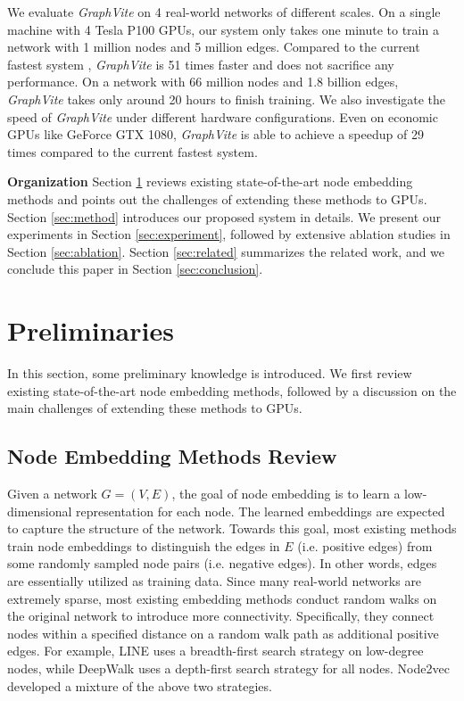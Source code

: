 \documentclass[sigconf]{acmart}
\newcommand{\Graphy}{\textit{GraphVite}\xspace}
\begin{document}
We evaluate \Graphy on 4 real-world networks of different scales. On a single machine with 4 Tesla P100 GPUs, our system only takes one minute to train a network with 1 million nodes and 5 million edges. Compared to the current fastest system \cite{tang2015line}, \Graphy is 51 times faster and does not sacrifice any performance. On a network with 66 million nodes and 1.8 billion edges, \Graphy takes only around 20 hours to finish training. We also investigate the speed of \Graphy under different hardware configurations. Even on economic GPUs like GeForce GTX 1080, \Graphy is able to achieve a speedup of 29 times compared to the current fastest system.

\noindent \textbf{Organization} Section \ref{sec:preliminary} reviews existing state-of-the-art node embedding methods and points out the challenges of extending these methods to GPUs. Section \ref{sec:method} introduces our proposed system in details. We present our experiments in Section \ref{sec:experiment}, followed by extensive ablation studies in Section \ref{sec:ablation}. Section \ref{sec:related} summarizes the related work, and we conclude this paper in Section \ref{sec:conclusion}. \section{Preliminaries}
\label{sec:preliminary}

In this section, some preliminary knowledge is introduced. We first review existing state-of-the-art node embedding methods, followed by a discussion on the main challenges of extending these methods to GPUs.

\subsection{Node Embedding Methods Review}
\label{sec:method_review}

Given a network $G = (V, E)$, the goal of node embedding is to learn a low-dimensional representation for each node. The learned embeddings are expected to capture the structure of the network. Towards this goal, most existing methods train node embeddings to distinguish the edges in $E$ (i.e. positive edges) from some randomly sampled node pairs (i.e. negative edges). In other words, edges are essentially utilized as training data. Since many real-world networks are extremely sparse, most existing embedding methods conduct random walks on the original network to introduce more connectivity. Specifically, they connect nodes within a specified distance on a random walk path as additional positive edges. For example, LINE \cite{tang2015line} uses a breadth-first search strategy on low-degree nodes, while DeepWalk \cite{perozzi2014deepwalk} uses a depth-first search strategy for all nodes. Node2vec \cite{grover2016node2vec} developed a mixture of the above two strategies.
\end{document}
